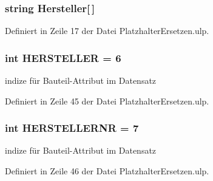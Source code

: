 \hypertarget{_platzhalter_ersetzen_8ulp_a03dd05fe151d0e9f9edf96078bc234d4}{}
\subsubsection[{Hersteller}]{\setlength{\rightskip}{0pt plus 5cm}string Hersteller\mbox{[}$\,$\mbox{]}}\label{_platzhalter_ersetzen_8ulp_a03dd05fe151d0e9f9edf96078bc234d4}


Definiert in Zeile 17 der Datei Platzhalter\+Ersetzen.\+ulp.

\hypertarget{_platzhalter_ersetzen_8ulp_af1d4fe1dc2c108fc8a59c5b3b90252a3}{}
\subsubsection[{H\+E\+R\+S\+T\+E\+L\+L\+E\+R}]{\setlength{\rightskip}{0pt plus 5cm}int H\+E\+R\+S\+T\+E\+L\+L\+E\+R = 6}\label{_platzhalter_ersetzen_8ulp_af1d4fe1dc2c108fc8a59c5b3b90252a3}


indize für Bauteil-\/\+Attribut im Datensatz 



Definiert in Zeile 45 der Datei Platzhalter\+Ersetzen.\+ulp.

\hypertarget{_platzhalter_ersetzen_8ulp_ab14fde5d8767bd16f5b91ed81d0d462d}{}
\subsubsection[{H\+E\+R\+S\+T\+E\+L\+L\+E\+R\+N\+R}]{\setlength{\rightskip}{0pt plus 5cm}int H\+E\+R\+S\+T\+E\+L\+L\+E\+R\+N\+R = 7}\label{_platzhalter_ersetzen_8ulp_ab14fde5d8767bd16f5b91ed81d0d462d}


indize für Bauteil-\/\+Attribut im Datensatz 



Definiert in Zeile 46 der Datei Platzhalter\+Ersetzen.\+ulp.

